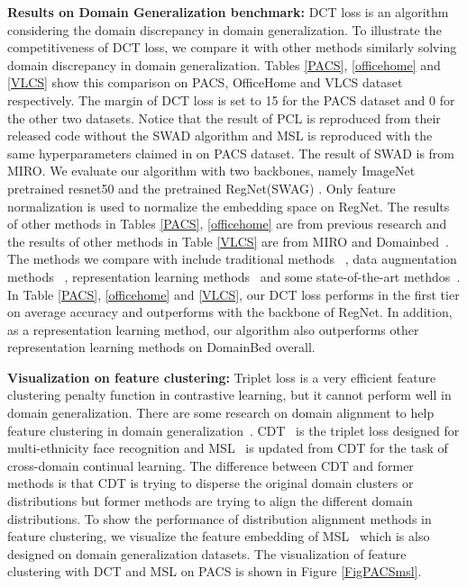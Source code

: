 \documentclass[a4paper,fleqn]{cas-dc}
\begin{document}
\textbf{Results on Domain Generalization benchmark:} DCT loss is an algorithm considering the domain discrepancy in domain generalization. To illustrate the competitiveness of DCT loss, we compare it with other methods similarly solving domain discrepancy in domain generalization. Tables \ref{PACS}, \ref{officehome} and \ref{VLCS} show this comparison on PACS, OfficeHome and VLCS dataset respectively.  The margin of DCT loss is set to 15 for the PACS dataset and 0 for the other two datasets. Notice that the result of PCL is reproduced from their released code without the SWAD algorithm and MSL is reproduced with the same hyperparameters claimed in \cite{MSL} on PACS dataset. The result of SWAD is from MIRO\cite{miro}. We evaluate our algorithm with two backbones, namely ImageNet pretrained resnet50 \cite{resnet} and the pretrained RegNet(SWAG) \cite{regnet}. Only feature normalization is used to normalize the embedding space on RegNet. The results of other methods in Tables \ref{PACS}, \ref{officehome} are from previous research\cite{pcl, miro} and the results of other methods in Table \ref{VLCS} are from  MIRO and Domainbed~\cite{miro, domainbed}. The methods we compare with include traditional methods ~\cite{erm, IRM}, data augmentation methods ~\cite{mixstyle, mixup}, representation learning methods~\cite{coral,IRM} and some state-of-the-art methdos~\cite{pcl,miro}. In Table \ref{PACS}, \ref{officehome} and \ref{VLCS}, our DCT loss performs in the first tier on average accuracy and outperforms with the backbone of RegNet. In addition, as a representation learning method, our algorithm also  outperforms other representation learning methods on DomainBed overall.  \par
\textbf{Visualization on feature clustering:}
Triplet loss is a very efficient feature clustering penalty function in contrastive learning, but it cannot perform well in domain generalization. There are some research on domain alignment to help feature clustering in domain generalization~\cite{CDT, MSL}. CDT~\cite{CDT} is the triplet loss designed for multi-ethnicity face recognition and MSL~\cite{MSL} is updated from CDT for the task of cross-domain continual learning. The difference between CDT and former methods is that CDT is trying to disperse the original domain clusters or distributions but former methods are trying to align the different domain distributions. To show the performance of distribution alignment methods in feature clustering, we visualize the feature embedding of MSL~\cite{MSL} which is also designed on domain generalization datasets. The visualization of feature clustering with DCT and MSL on PACS is shown in Figure \ref{FigPACSmsl}. \par
\end{document}
